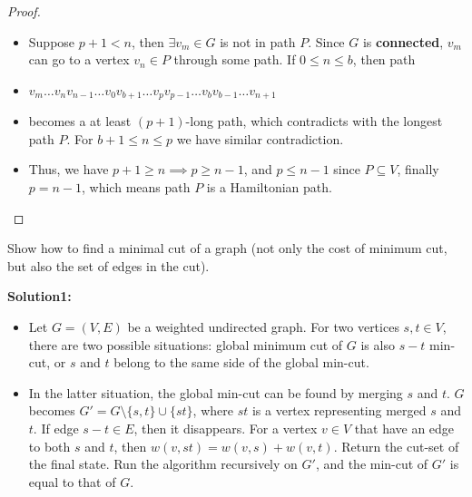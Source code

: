 \documentclass{article}
\newcounter{exercise}
\newcommand{\<}{
    \langle}
\renewcommand{\>}{
    \rangle}
\begin{document}
{\begin{proof}
\begin{itemize}
        \item Suppose $p+1 < n$, then $\exists v_m \in G$ is not in path $P$. Since $G$ is \textbf{connected}, $v_m$ can go to a vertex $v_n\in P$ through some path. If $0\leq n\leq b$, then path
        \item $v_m \ldots  v_n v_{n-1} \ldots  v_0 v_{b+1} \ldots  v_{p} v_{p-1} \ldots  v_{b} v_{b-1} \ldots  v_{n+1}$ 
        \item becomes a at least $(p+1)$-long path, which contradicts with the longest path $P$. For $b+1\leq n\leq p$ we have similar contradiction. 
        \item Thus, we have $p+1 \geq n\implies p\geq n-1$, and $p \leq n-1$ since $P \subseteq V$, finally $p=n-1$, which means path $P$ is a Hamiltonian path.
    \end{itemize}
    
\end{proof}




\begin{exercise}
Show how to find a minimal cut of a graph (not only the cost of minimum cut, but also the set of edges in the cut).
\end{exercise}

\textbf{Solution1:}

    \begin{itemize}
        \item Let $G=(V,E)$ be a weighted undirected graph. For two vertices $s,t\in V$, there are two possible situations: global minimum cut of $G$ is also $s-t$ min-cut, or $s$ and $t$ belong to the same side of the global min-cut.
        \item In the latter situation, the global min-cut can be found by merging $s$ and $t$. $G$ becomes $G'=G\setminus \{s,t\}\cup \{st\}$, where $st$ is a vertex representing merged $s$ and $t$. If edge $s-t\in E$, then it disappears. For a vertex $v\in V$ that have an edge to both $s$ and $t$, then $w(v,st)=w(v,s)+w(v,t)$. Return the cut-set of the final state. Run the algorithm recursively on $G'$, and the min-cut of $G'$ is equal to that of $G$.
        

\end{itemize}}
\end{document}
